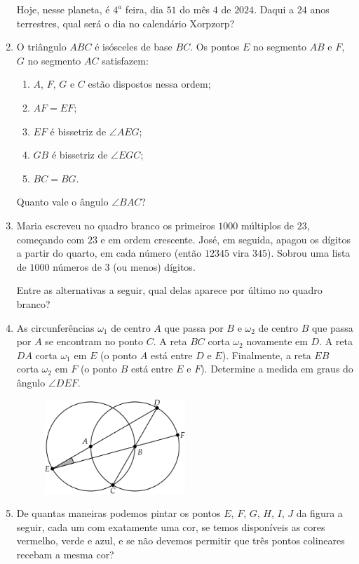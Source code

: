 \documentclass[12pt]{article}
\begin{document}
\begin{enumerate}[label=\textbf{\arabic*.}]
Hoje, nesse planeta, é $4^a$ feira, dia $51$ do mês $4$ de $2024$. Daqui a $24$ anos terrestres, qual será o dia no calendário
Xorpzorp?
\item O triângulo $ABC$ é isósceles de base $BC$. Os pontos $E$ no segmento $AB$ e $F$, $G$ no segmento $AC$ satisfazem:
\begin{enumerate}[label={\roman*.}]
  \item $A$, $F$, $G$ e $C$ estão dispostos nessa ordem;
  \item $AF = EF$;
  \item $EF$ é bissetriz de $\angle AEG$;
  \item $GB$ é bissetriz de $\angle EGC$;
  \item $BC = BG$.
\end{enumerate}
Quanto vale o ângulo $\angle BAC$?
\item Maria escreveu no quadro branco os primeiros $1000$ múltiplos de $23$, começando com $23$ e em ordem
crescente. José, em seguida, apagou os dígitos a partir do quarto, em cada número (então $12345$ vira $345$).
Sobrou uma lista de $1000$ números de $3$ (ou menos) dígitos.

Entre as alternativas a seguir, qual delas aparece por último no quadro branco?
\item As circunferências $\omega_1$ de centro $A$ que passa por $B$ e $\omega_2$ de centro $B$ que passa por $A$ se encontram no ponto
$C$. A reta $BC$ corta $\omega_2$ novamente em $D$. A reta $DA$ corta $\omega_1$ em $E$ (o ponto $A$ está entre $D$ e $E$). Finalmente, a
reta $EB$ corta $\omega_2$ em $F$ (o ponto $B$ está entre $E$ e $F$). Determine a medida em graus do ângulo $\angle DEF$.
          \begin{figure}[h]
            \centering
            \includegraphics[width=0.5\textwidth]{fourth.png}
          \end{figure}
        \item De quantas maneiras podemos pintar os pontos $E$, $F$, $G$, $H$, $I$, $J$ da figura a seguir, cada um com exatamente
uma cor, se temos disponíveis as cores vermelho, verde e azul, e se não devemos permitir que três pontos
colineares recebam a mesma cor?


\end{enumerate}
\end{document}
